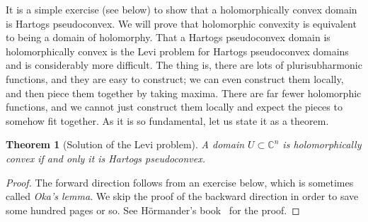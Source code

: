 \documentclass[12pt,openany]{book}
\newcommand{\C}{{\mathbb{C}}}
\newcommand{\myindex}[1]{#1\index{#1}}
\theoremstyle{plain}
\newtheorem{thm}{Theorem}[section]
\theoremstyle{remark}
\theoremstyle{definition}
\theoremstyle{exercise}
\theoremstyle{example}
\begin{document}
It is a simple exercise (see below) to show that a holomorphically convex
domain is Hartogs pseudoconvex.  We will prove that holomorphic convexity is
equivalent to being a domain of holomorphy.  That a Hartogs pseudoconvex
domain is holomorphically convex is the
Levi problem
for Hartogs pseudoconvex domains and is considerably more
difficult.  The thing is, there are lots of plurisubharmonic functions,
and they are easy to construct; we can even construct them locally, and then
piece them together by taking maxima.  There are far fewer holomorphic functions, and
we cannot just construct them locally and expect the pieces to somehow fit
together.  As it is so fundamental, let us state it as a theorem.

\begin{thm}[Solution of the Levi problem]
A domain $U \subset \C^n$ is holomorphically convex
if and only it is Hartogs pseudoconvex.
\end{thm}

\begin{proof}
The forward direction follows from an exercise below, which is sometimes
called \emph{\myindex{Oka's lemma}}.
We skip the proof of the backward direction
in order to save some hundred pages or so.
See H\"ormander's book~\cite{Hormander} for the proof.
\end{proof}
\end{document}
